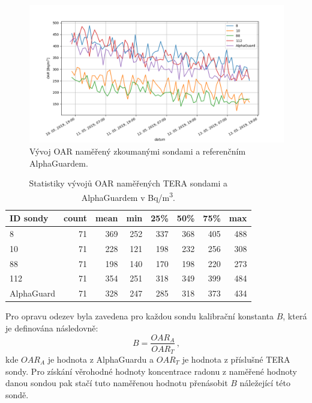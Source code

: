 \begin{figure}[H]
	\centering
	\includegraphics[width=1\linewidth]{images/sondy_srovnani}
	\caption{Vývoj OAR naměřený zkoumanými sondami a referenčním AlphaGuardem.}
	\label{fig:dynMer_sondySrovnani}
\end{figure}
\begin{table}[ht]
	\centering
	\caption{Statistiky vývojů OAR naměřených TERA sondami a AlphaGuardem v \si{Bq/m^3}.}
	\label{tab:dynMer_sondy}
	\begin{tabular}{lrrrrrrr}
		\toprule
		ID sondy &  count &  mean    &  min &  25\% &  50\% &  75\% &  max \\
		\midrule
		8          &     71 &   369  &  252 &  337 &  368 &  405 &  488 \\
		10         &     71 &   228  &  121 &  198 &  232 &  256 &  308 \\
		88         &     71 &   198  &  140 &  170 &  198 &  220 &  273 \\
		112        &     71 &   354  &  251 &  318 &  349 &  399 &  484 \\
		\midrule
		AlphaGuard &     71 &   328  &  247 &  285 &  318 &  373 &  434 \\
		\bottomrule
	\end{tabular}
      
      
\end{table}

Pro opravu odezev byla zavedena pro každou sondu kalibrační konstanta $B$, která je definována následovně:
\begin{equation}
	B=\frac{OAR_A}{OAR_T}\,,
\end{equation}
kde $OAR_A$ je hodnota z AlphaGuardu a $OAR_T$ je hodnota z příslušné TERA sondy. Pro získání věrohodné hodnoty koncentrace radonu z naměřené hodnoty danou sondou pak stačí tuto naměřenou hodnotu přenásobit $B$ náležející této sondě.

